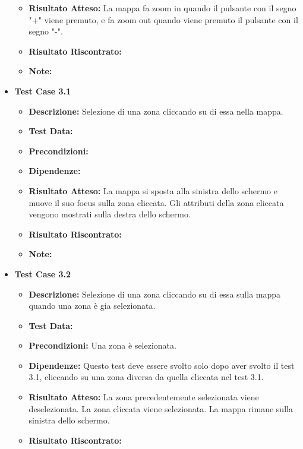 \begin{itemize}
\begin{itemize}
                    \item \textbf{Risultato Atteso:} La mappa fa zoom in quando il pulsante con il segno "+" viene premuto, e fa zoom out quando viene premuto il pulsante con il segno "-".
                    \item \textbf{Risultato Riscontrato:}
                    \item \textbf{Note:}
                \end{itemize}
            \item \textbf{Test Case 3.1}
                \begin{itemize}
                    \item \textbf{Descrizione:} Selezione di una zona cliccando su di essa nella mappa.
                    \item \textbf{Test Data:}
                    \item \textbf{Precondizioni:} 
                    \item \textbf{Dipendenze:}
                    \item \textbf{Risultato Atteso:} La mappa si sposta alla sinistra dello schermo e muove il suo focus sulla zona cliccata. Gli attributi della zona cliccata vengono mostrati sulla destra dello schermo.
                    \item \textbf{Risultato Riscontrato:}
                    \item \textbf{Note:}
                \end{itemize}
            \item \textbf{Test Case 3.2}
                \begin{itemize}
                    \item \textbf{Descrizione:} Selezione di una zona cliccando su di essa sulla mappa quando una zona è gia selezionata.
                    \item \textbf{Test Data:}
                    \item \textbf{Precondizioni:} Una zona è selezionata.
                    \item \textbf{Dipendenze:} Questo test deve essere svolto solo dopo aver svolto il test 3.1, cliccando su una zona diversa da quella cliccata nel test 3.1.
                    \item \textbf{Risultato Atteso:} La zona precedentemente selezionata viene deselezionata. La zona cliccata viene selezionata. La mappa rimane sulla sinistra dello schermo.
                    \item \textbf{Risultato Riscontrato:}

\end{itemize}
\end{itemize}
